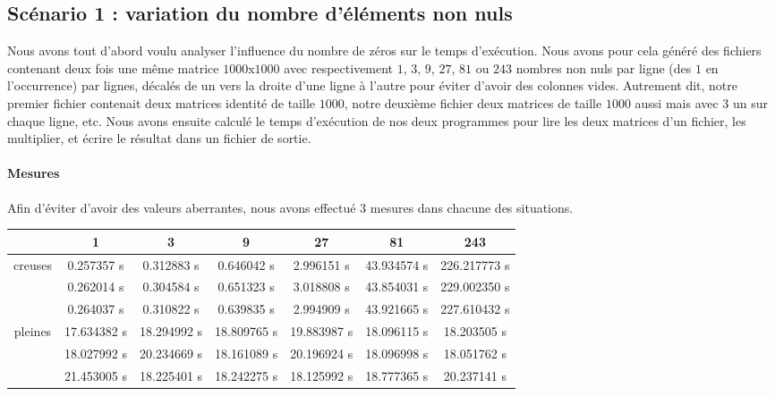 \documentclass[12pt,a4paper]{article}
\begin{document}
\subsection{Scénario 1 : variation du nombre d'éléments non nuls}

Nous avons tout d'abord voulu analyser l'influence du nombre de zéros sur le temps d'exécution. Nous avons pour cela généré des fichiers contenant deux fois une même matrice $1000$x$1000$ avec respectivement $1$, $3$, $9$, $27$, $81$ ou $243$ nombres non nuls par ligne (des $1$ en l'occurrence) par lignes, décalés de un vers la droite d'une ligne à l'autre pour éviter d'avoir des colonnes vides. Autrement dit, notre premier fichier contenait  deux matrices identité de taille $1000$, notre deuxième fichier deux matrices de taille $1000$ aussi mais avec $3$ un sur chaque ligne, etc. Nous avons ensuite calculé le temps d'exécution de nos deux programmes pour lire les deux matrices d'un fichier, les multiplier, et écrire le résultat dans un fichier de sortie. 

\paragraph{Mesures}
Afin d'éviter d'avoir des valeurs aberrantes, nous avons effectué 3 mesures dans chacune des situations. \\

\begin{tabular}{|*{7}{c|}}
    \hline
       & 1  & 3  & 9  & 27  & 81  & 243 \\
    \hline
    \multirow{3}{*}{creuses}  & 0.257357 s & 0.312883 s & 0.646042 s & 2.996151 s & 43.934574 s & 226.217773 s\\
    & 0.262014 s & 0.304584 s & 0.651323 s & 3.018808 s & 43.854031 s & 229.002350 s\\
    & 0.264037 s & 0.310822 s & 0.639835 s & 2.994909 s & 43.921665 s & 227.610432 s\\
    \hline
     \multirow{3}{*}{pleines} & 17.634382 s & 18.294992 s & 18.809765 s  & 19.883987 s & 18.096115 s & 18.203505 s\\
    & 18.027992 s & 20.234669 s & 18.161089 s & 20.196924 s & 18.096998 s & 18.051762 s\\
    & 21.453005 s & 18.225401 s & 18.242275 s & 18.125992 s & 18.777365 s & 20.237141 s\\
    \hline
\end{tabular}
\end{document}
